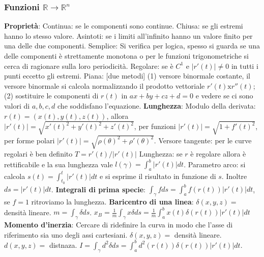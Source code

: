 \documentclass[fontsize=8pt]{scrartcl}
\begin{document}
\begin{multicols*}{4}
\subsubsection*{Funzioni $\mathbb{R} \rightarrow \mathbb{R}^n$}
\textbf{Proprietà}:\newline
Continua: se le componenti sono continue.\newline
Chiusa: se gli estremi hanno lo stesso valore.\newline
Asintoti: se i limiti all'infinito hanno un valore finito per una delle due componenti.\newline
Semplice: Si verifica per logica, spesso si guarda se una delle componenti è strettamente monotona o per le funzioni trigonometriche si cerca di ragionare sulla loro periodicità.\newline
Regolare: se è $C^1$ e $|r'(t)|\neq 0$ in tutti i punti eccetto gli estremi.\newline
Piana: [due metodi] (1) versore binormale costante, il versore binormale si calcola normalizzando il prodotto vettoriale $r'(t)\text{x}r''(t)$; (2) sostituire le componenti di $r(t)$ in $ax + by + cz + d = 0$ e vedere se ci sono valori di $a,b,c,d$ che soddisfano l'equazione.
\textbf{Lunghezza}:\newline
Modulo della derivata: $r(t) = (x(t),y(t),z(t))$, allora $|r'(t)| = \sqrt{x'(t)^2 + y'(t)^2 + z'(t)^2}$, per funzioni $|r'(t)| = \sqrt{1 + f'(t)^2}$, per forme polari $|r'(t)| = \sqrt{\rho(\theta)^2 + \rho'(\theta)^2}$.\newline
Versore tangente: per le curve regolari è ben definito $T = r'(t) / |r'(t)|$\newline
Lunghezza: se $r$ è regolare allora è rettificabile e la sua lunghezza vale $l(\gamma) = \int_{a}^{b} |r'(t)| dt$.\newline
Parametro arco: si calcola $s(t) = \int_{t_0}^{t} |r'(t)| dt$ e si esprime il risultato in funzione di $s$. Inoltre $ds = |r'(t)| dt$.\newline
\textbf{Integrali di prima specie}:\newline
$\int_\gamma f ds = \int_{a}^{b} f(r(t)) |r'(t)| dt$, se $f=1$ ritroviamo la lunghezza.\newline
\textbf{Baricentro di una linea}:\newline
$\delta (x,y,z) =$ densità lineare.\newline
$m = \int_\gamma \delta ds$.\newline
$x_B = \frac{1}{m} \int_\gamma x \delta ds = \frac{1}{m} \int_{a}^{b} x(t) \delta(r(t))|r'(t)| dt$\newline
\textbf{Momento d'inerzia}:\newline
Cercare di ridefinire la curva in modo che l'asse di riferimento sia uno degli assi cartesiani.\newline
$\delta(x,y,z) =$ densità lineare.\newline
$d(x,y,z) =$ distnaza.\newline
$I = \int_\gamma d^2 \delta ds = \int_{a}^{b} d^2(r(t)) \delta(r(t)) |r'(t)| dt$.

\end{multicols*}
\end{document}
